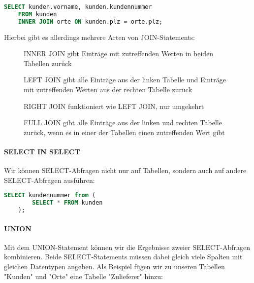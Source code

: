 \documentclass{article}
\begin{document}
	\begin{lstlisting}[language=SQL, caption=Wir erhalten Vornamen sowie Kundennummern und dazugehörige Ortsnamen]
	SELECT kunden.vorname, kunden.kundennummer 
	FROM kunden
	INNER JOIN orte ON kunden.plz = orte.plz;
	\end{lstlisting}

	Hierbei gibt es allerdings mehrere Arten von JOIN-Statements:

	\begin{figure}[h!]
		\centering
		
		\caption{INNER JOIN gibt Einträge mit zutreffenden Werten in beiden Tabellen zurück}
	\end{figure}

	\begin{figure}[h!]
		\centering
		
		\caption{LEFT JOIN gibt alle Einträge aus der linken Tabelle und Einträge mit zutreffenden Werten aus der rechten Tabelle zurück}
	\end{figure}

	\begin{figure}[h!]
		\centering
		
		\caption{RIGHT JOIN funktioniert wie LEFT JOIN, nur umgekehrt}
	\end{figure}

	\begin{figure}[h!]
		\centering
		
		\caption{FULL JOIN gibt alle Einträge aus der linken und rechten Tabelle zurück, wenn es in einer der Tabellen einen zutreffenden Wert gibt}
	\end{figure}

	\paragraph{SELECT IN SELECT}
	Wir können SELECT-Abfragen nicht nur auf Tabellen, sondern auch auf andere SELECT-Abfragen ausführen:

	\begin{lstlisting}[language=SQL]
	SELECT kundennummer from (
		SELECT * FROM kunden
	);
	\end{lstlisting}

	\paragraph{UNION}
	Mit dem UNION-Statement können wir die Ergebnisse zweier SELECT-Abfragen kombinieren. Beide SELECT-Statements müssen dabei gleich viele Spalten mit gleichen Datentypen angeben.
	Als Beispiel fügen wir zu unseren Tabellen "Kunden" und "Orte" eine Tabelle "Zulieferer" hinzu:
\end{document}
